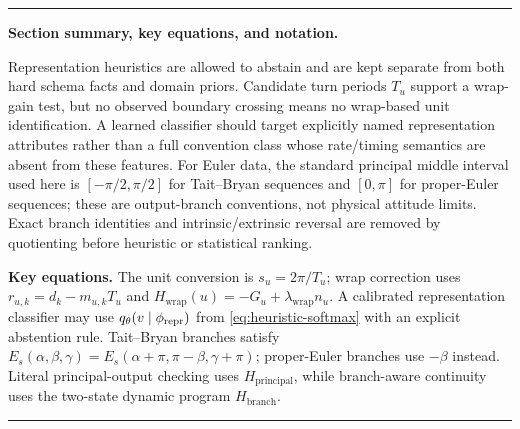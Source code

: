 \documentclass[11pt]{article}
\newenvironment{sectionrecap}
{\par\medskip\begingroup\small\noindent\rule{\linewidth}{0.4pt}\par
\smallskip\noindent\textbf{Section summary, key equations, and notation.}\par\smallskip}
{\par\smallskip\noindent\rule{\linewidth}{0.4pt}\par\endgroup\medskip}
\begin{document}
    \begin{sectionrecap}
        Representation heuristics are allowed to abstain and are kept separate from both hard
        schema facts and domain priors. Candidate turn periods $T_u$ support a wrap-gain test,
        but no observed boundary crossing means no wrap-based unit identification. A learned classifier should target explicitly named representation attributes rather than a
        full convention class whose rate/timing semantics are absent from these features. For Euler data, the standard principal middle interval used here is
        $[-\pi/2,\pi/2]$ for Tait--Bryan sequences and $[0,\pi]$ for proper-Euler sequences;
        these are output-branch conventions, not physical attitude limits. Exact branch
        identities and intrinsic/extrinsic reversal are removed by quotienting before heuristic
        or statistical ranking.

        \noindent\textbf{Key equations.}
        The unit conversion is $s_u=2\pi/T_u$; wrap correction uses
        $r_{u,k}=d_k-m_{u,k}T_u$ and
        $H_{\mathrm{wrap}}(u)=-G_u+\lambda_{\mathrm{wrap}}n_u$.
        A calibrated representation classifier may use
        $q_\theta(v\mid\phi_{\rm repr})$ from \eqref{eq:heuristic-softmax} with an explicit
        abstention rule. Tait--Bryan branches satisfy
        \(E_s(\alpha,\beta,\gamma)=E_s(\alpha+\pi,\pi-\beta,\gamma+\pi)\);
        proper-Euler branches use $-\beta$ instead. Literal principal-output checking uses
        $H_{\mathrm{principal}}$, while branch-aware continuity uses the two-state dynamic
        program $H_{\mathrm{branch}}$.


\end{sectionrecap}
\end{document}
